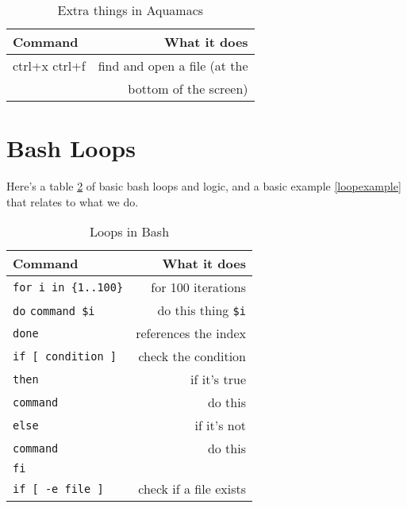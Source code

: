 \documentclass{article}
\begin{document}
\begin{table}
        \begin{center}
                \caption{Extra things in Aquamacs}
                \label{AquamacsChart}
                \begin{tabular}{l|r}
                  \textbf{Command} & \textbf{What it does}\\
                  \hline
                  ctrl+x ctrl+f & find and open a file (at the \\
                   & bottom of the screen) \\
                 \end{tabular}
        \end{center}
\end{table}

\section{Bash Loops}

Here's a table \ref{bashloops} of basic bash loops and logic, and a
basic example \ref{loopexample} that relates to what we do.

\begin{table}
        \begin{center}
                \caption{Loops in Bash}
                \label{bashloops}
                \begin{tabular}{l|r}
                  \textbf{Command} & \textbf{What it does}\\
                  \hline
                  \verb|for i in {1..100}| & for 100 iterations\\
                  \verb|do|
                  \verb|command $i| & do this thing \verb|$i| \\
                  \verb|done| & references the index \\
                  \hline
                  \verb|if [ condition ]| & check the condition \\
                  \verb|then| & if it's true \\
                  \verb|command| & do this \\
                  \verb|else| & if it's not \\
                  \verb|command| & do this \\
                  \verb|fi| & \\
                  \hline
                  \verb|if [ -e file ] |& check if a file exists \\
                 \end{tabular}
        \end{center}
      \end{table}
      
\end{document}
